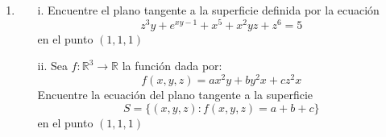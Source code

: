 \documentclass[letterpaper,11pt]{article}
\begin{document}
\begin{enumerate}
\begin{enumerate}
    \item
    \begin{itemize}
        \item[i.] Encuentre el plano tangente a la superficie definida por la ecuación
        \[z^3y+e^{xy-1}+x^5+x^2yz+z^6=5\]
        en el punto $(1,1,1)$
    
        \item[ii.] Sea $f:\mathbb{R}^3\rightarrow\mathbb{R}$ la función dada por:
        \[f(x,y,z)=ax^2y+by^2x+cz^2x\]
        Encuentre la ecuación del plano tangente a la superficie
        \[S=\{(x,y,z): f(x,y,z)=a+b+c\}\]
        en el punto $(1,1,1)$
    \end{itemize}
\end{enumerate}

\end{enumerate}
\end{document}
